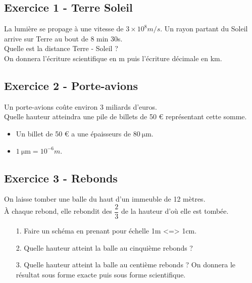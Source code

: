 \documentclass[10pt]{article}
\begin{document}
\subsection*{Exercice 1 - Terre Soleil} 

La lumière se propage à une vitesse de $3 \times 10^8 m/s$. Un rayon partant du Soleil arrive sur Terre au bout de 8 min 30s. \\
Quelle est la distance Terre - Soleil ? \\
On donnera l'écriture scientifique en m puis l'écriture décimale en km.


\subsection*{Exercice 2 - Porte-avions} 

Un porte-avions coûte environ 3 miliards d'euros. \\
Quelle hauteur atteindra une pile de billets de 50 \euro \: représentant cette somme.

\begin{itemize}
\item Un billet de 50 \euro \: a une épaisseurs de $\SI{80}{\micro\meter}$. 
\item $\SI{1}{\micro \meter} = 10^{-6}m$.
\end{itemize}

\subsection*{Exercice 3 - Rebonds}

On laisse tomber une balle du haut d'un immeuble de 12 mètres.\\
À chaque rebond, elle rebondit des $\dfrac{2}{3}$ de la hauteur d'où elle est tombée.\\
\begin{enumerate}
\item[1.] Faire un schéma en prenant pour échelle 1m <=> 1cm.

\item[2.] Quelle hauteur atteint la balle au cinquième rebonds ?

\item[3.] Quelle hauteur atteint la balle au centième rebonds ? On donnera le résultat sous forme exacte puis sous forme scientifique.
\end{enumerate}
\end{document}
